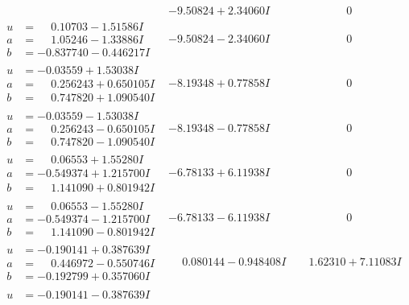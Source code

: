 \documentclass[1p]{elsarticle_modified}
\theoremstyle{definition}
\begin{document}
$$\begin{array}{c|c|c}
 & -9.50824 + 2.34060 I & \phantom{-0.000000 } 0 \\ \hline\begin{aligned}
u &= \phantom{-}0.10703 - 1.51586 I \\
a &= \phantom{-}1.05246 - 1.33886 I \\
b &= -0.837740 - 0.446217 I\end{aligned}
 & -9.50824 - 2.34060 I & \phantom{-0.000000 } 0 \\ \hline\begin{aligned}
u &= -0.03559 + 1.53038 I \\
a &= \phantom{-}0.256243 + 0.650105 I \\
b &= \phantom{-}0.747820 + 1.090540 I\end{aligned}
 & -8.19348 + 0.77858 I & \phantom{-0.000000 } 0 \\ \hline\begin{aligned}
u &= -0.03559 - 1.53038 I \\
a &= \phantom{-}0.256243 - 0.650105 I \\
b &= \phantom{-}0.747820 - 1.090540 I\end{aligned}
 & -8.19348 - 0.77858 I & \phantom{-0.000000 } 0 \\ \hline\begin{aligned}
u &= \phantom{-}0.06553 + 1.55280 I \\
a &= -0.549374 + 1.215700 I \\
b &= \phantom{-}1.141090 + 0.801942 I\end{aligned}
 & -6.78133 + 6.11938 I & \phantom{-0.000000 } 0 \\ \hline\begin{aligned}
u &= \phantom{-}0.06553 - 1.55280 I \\
a &= -0.549374 - 1.215700 I \\
b &= \phantom{-}1.141090 - 0.801942 I\end{aligned}
 & -6.78133 - 6.11938 I & \phantom{-0.000000 } 0 \\ \hline\begin{aligned}
u &= -0.190141 + 0.387639 I \\
a &= \phantom{-}0.446972 - 0.550746 I \\
b &= -0.192799 + 0.357060 I\end{aligned}
 & \phantom{-}0.080144 - 0.948408 I & \phantom{-}1.62310 + 7.11083 I \\ \hline\begin{aligned}
u &= -0.190141 - 0.387639 I \\

\end{aligned}
\end{array}$$
\end{document}
